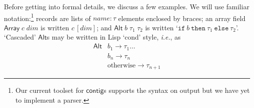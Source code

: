 \documentclass[a4paper,UKenglish,cleveref, autoref, thm-restate]{lipics-v2021}
\newcommand{\ie}{\textit{i.e.}}
\newcommand{\konst}[1]{\ensuremath{\mathsf{#1}}}
\newcommand{\itelse}[3]{\mbox{$\mathtt{if}\ {#1}\ \mathtt{then}\ {#2}\ \mathtt{else}\ {#3}$}}
\begin{document}
Before getting into formal details, we discuss a few examples.  We
will use familiar notation:\footnote{Our current toolset for
  \konst{contig}s supports the syntax on output but we have yet to
  implement a parser.} records are lists of $\mathit{name} : \tau$
elements enclosed by braces; an array field
$\konst{Array}\;c\;\mathit{dim}$ is written $c\, [\mathit{dim}]$; and
$\konst{Alt}\;b\;\tau_1\;\tau_2$ is written
`$\itelse{b}{\tau_1}{\tau_2}$'. `Cascaded' \konst{Alt}s may be written
in Lisp `cond' style, \ie, as
\[
\begin{array}{ll}
\konst{Alt} & b_1 \longrightarrow \tau_1 \ldots \\
            & b_n \longrightarrow \tau_n \\
            & \text{otherwise} \longrightarrow \tau_{n+1}
\end{array}
\]
\end{document}
